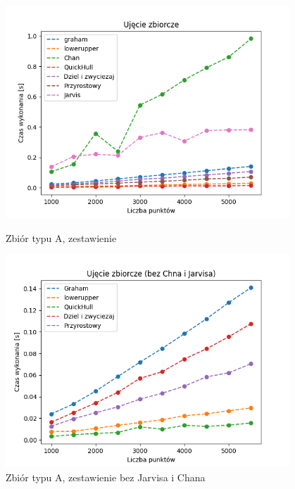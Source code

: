 \documentclass[11pt]{article}
\theoremstyle{remark} \newtheorem{definition}{def.}
\theoremstyle{definition} \newtheorem{twierdzenie}{tw.}
\begin{document}
\begin{figure}[]
    \centering
    \begin{minipage}{0.48\textwidth}
        \centering
        \includegraphics[width=0.95\textwidth]{../tests/chmura-zbiorczy.png} %
        \caption{Zbiór typu A, zestawienie}
        \label{fig:chmura-zbiorczy}
    \end{minipage}\hfill
    \begin{minipage}{0.48\textwidth}
        \centering
        \includegraphics[width=0.95\textwidth]{../tests/chmura-zbiorczy-2.png} %
        \caption{Zbiór typu A, zestawienie bez Jarvisa i Chana}
        \label{fig:chmura-zbiorczy-2}
    \end{minipage}
\end{figure}
\end{document}
